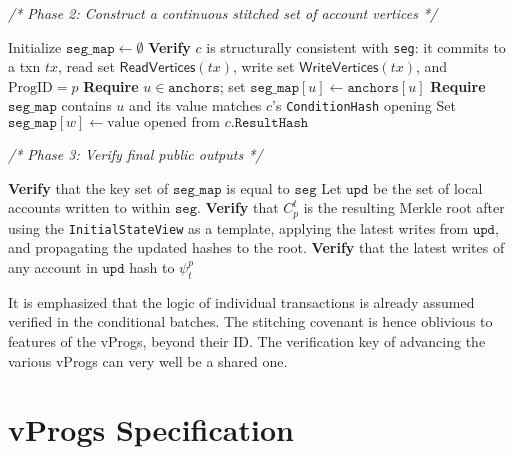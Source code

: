 \documentclass[onecolumn, 9pt, a4paper]{extarticle}
\begin{document}
\begin{figure*}[!t]
\begin{whitebgbox}
\begin{algorithm}[H]
\begin{algorithmic}[1]
    \vspace{0.5em}
    \Statex \textit{/* Phase 2: Construct a continuous stitched set of account vertices */}
    
    \State Initialize $\texttt{seg\_map} \gets \emptyset$
        \State \textbf{Verify} $c$ is structurally consistent with \texttt{seg}: it commits to a txn $tx$, read set $\mathsf{ReadVertices}(tx)$, write set $\mathsf{WriteVertices}(tx)$, and $\mathrm{ProgID}=p$
                \State \textbf{Require} $u \in \texttt{anchors}$; set $\texttt{seg\_map}[u] \gets \texttt{anchors}[u]$
            \Else
                \State \textbf{Require} $\texttt{seg\_map}$ contains $u$ and its value matches $c$'s \texttt{ConditionHash} opening
            \EndIf
        \EndFor
            \State Set $\texttt{seg\_map}[w] \gets \text{value opened from } c.\texttt{ResultHash}$
        \EndFor
    \EndFor
    
    \vspace{0.5em}
    \Statex \textit{/* Phase 3: Verify final public outputs */}
    
    \State \textbf{Verify} that the key set of $\texttt{seg\_map}$  is equal to  $\texttt{seg}$
    \State Let $\texttt{upd}$ be the set of local accounts written to within $\texttt{seg}$.
    \State \textbf{Verify} that $C_p^t$ is the resulting Merkle root after using the \texttt{InitialStateView} as a template, applying the latest writes from $\texttt{upd}$, and propagating the updated hashes to the root.
    \State \textbf{Verify} that the latest writes of any account in $\texttt{upd}$ hash to $\psi^p_t$
\EndProcedure
\end{algorithmic}
\end{algorithm}
\end{whitebgbox}
\end{figure*}

It is emphasized that the logic of individual transactions is already assumed verified in the conditional batches. The stitching covenant is hence oblivious to features of the vProgs, beyond their ID. The verification key of advancing the various vProgs can very well be a shared one.

\section{vProgs Specification}\label{sec:vProg_prover}
\end{document}
